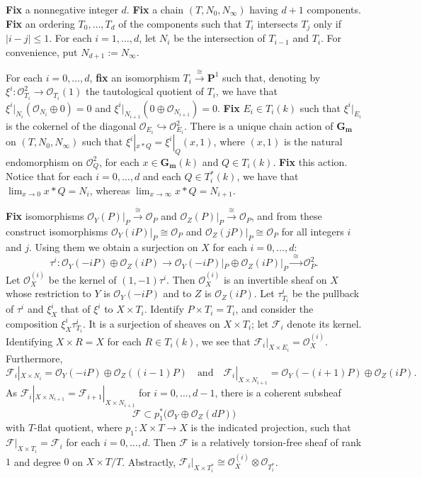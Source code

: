 \documentclass[a4paper,11pt]{amsart}
\theoremstyle{plain}
\theoremstyle{definition}
\theoremstyle{remark}
\def\cc{{\mathbf G}_{\mathbf m}}
\def\O{\mathcal{O}}
\def\IP{{\mathbf P}}
\def\F{\mathcal{F}}
\def\:{\colon}
\begin{document}
\textbf{Fix} a nonnegative integer $d$. \textbf{Fix} a chain $(T,N_0,N_\infty)$ having $d+1$ components. \textbf{Fix} an ordering $T_0,\dots,T_d$ of the components such that $T_i$ intersects $T_j$ only if $|i-j|\leq 1$. For each $i=1,\dots,d$, let
$N_i$ be the intersection of $T_{i-1}$ and $T_{i}$. For convenience, put $N_{d+1}:=N_\infty$. 

For each $i=0,\dots,d$, \textbf{fix} an isomorphism $T_i\xrightarrow{\cong}\IP^1$ such that, denoting by $\xi^i\colon\O_{T_i}^2\to\O_{T_i}(1)$ the tautological quotient of $T_i$, we have that $\xi^i|_{N_i}(\O_{N_i}\oplus 0)=0$ and $\xi^i|_{N_{i+1}}(0\oplus\O_{N_{i+1}})=0$. \textbf{Fix} $E_i\in T_i(k)$ such that $\xi^i|_{E_i}$ is the cokernel of the diagonal $\mathcal O_{E_i}\hookrightarrow\O_{E_i}^2$. There is a unique chain action of $\cc$ on $(T,N_0,N_\infty)$ such that $\xi^i|_{x\ast Q}=\xi^i|_Q(x,1)$, where $(x,1)$ is the natural endomorphism on $\O_{Q}^2$, for each $x\in\cc(k)$ and $Q\in T_i(k)$. \textbf{Fix} this action. Notice that for each $i=0,\dots,d$ and each $Q\in T_i^*(k)$, we have that %
$\lim_{x\to 0}x\ast Q=N_i$, whereas $\lim_{x\to\infty}x\ast Q=N_{i+1}$.

\textbf{Fix} isomorphisms $\O_Y(P)|_P\xrightarrow{\cong}\O_P$ and $\O_Z(P)|_P\xrightarrow{\cong}\O_P$, and from these construct isomorphisms $\O_Y(iP)|_P\cong\O_P$ and $\O_Z(jP)|_P\cong\O_P$ for all integers $i$ and $j$. Using them we obtain a surjection on $X$ for each $i=0,\dots,d$:
\[
\tau^i\colon \O_Y(-iP)\oplus\O_Z(iP) \longrightarrow
\O_Y(-iP)|_P\oplus\O_Z(iP)|_P \xrightarrow{\, \, \cong\, \, } \O_P^2.
\]
Let $\O_X^{(i)}$ be the kernel of $(1,-1)\tau^i$. 
Then $\O_X^{(i)}$ is an invertible sheaf on $X$ whose restriction to $Y$ 
is $\O_Y(-iP)$ and to $Z$ is $\O_Z(iP)$. Let $\tau^i_{T_i}$ be the pullback of
$\tau^i$ and $\xi^i_X$ that of $\xi^i$ to $X\times T_i$.
Identify $P\times T_i=T_i$, and consider
the composition $\xi^i_{X}\tau^i_{T_i}$. It is a surjection of sheaves on
$X\times T_i$; let $\mathcal F_i$ denote its kernel. Identifying $X\times R=X$ for each $R\in T_i(k)$, we see that $\F_i|_{X\times E_i}=\O_X^{(i)}$. Furthermore, 
\[
\mathcal F_i|_{X\times N_i}= \O_Y(-iP)\oplus\O_Z((i-1)P)\quad\text{and}\quad
\mathcal F_i|_{X\times N_{i+1}}=\O_Y(-(i+1)P)\oplus\O_Z(iP).
\]
As $\F_i|_{X\times N_{i+1}}=\F_{i+1}|_{X\times N_{i+1}}$ for $i=0,\dots,d-1$, there is a coherent subsheaf 
\[
\mathcal F\subset p^*_1\big(\O_Y\oplus\O_Z(dP)\big)
\]
with $T$-flat quotient, where $p_1\:X\times T\to X$ is the indicated projection, such that $\mathcal F|_{X\times T_i}=\mathcal F_i$ for each $i=0,\dots,d$. Then $\F$ is a relatively torsion-free sheaf of rank $1$ and degree $0$ on $X\times T/T$. Abstractly, $\F_i|_{X\times T_i^*}\cong\O_X^{(i)}\otimes\O_{T_i^*}$. 
\end{document}
